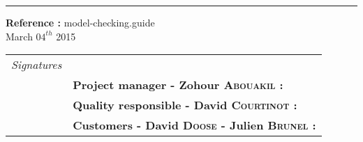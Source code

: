 \documentclass{report}
\begin{document}
\begin{titlepage}


\vspace*{4.5cm}

\noindent
\begin{minipage}{0.35\linewidth}
    \begin{flushright}
        \printauthor
    \end{flushright}
\end{minipage} \hspace{15pt}
%
\begin{minipage}{0.02\linewidth}
    \rule{1pt}{175pt}
\end{minipage} \hspace{-10pt}
%
\begin{minipage}{0.6\linewidth}
\vspace{5pt}
\newenvironment{test}{\begin{center}}{\end{center}}
\hspace{10pt}
\begin{minipage}{\linewidth} 
\textbf{Reference :} model-checking.guide ~\\
March $04^{th}$ 2015
\end{minipage}
\end{minipage}

\vspace{8cm}
\begin{minipage}{0.20\linewidth}
    \begin{flushright}
       
        \begin{tabular}{ll}
     \textit{Signatures} & \\
            & \textbf{Project manager - Zohour \textsc{Abouakil} :} \\
            & \textbf{Quality responsible - David \textsc{Courtinot} :} \\
            & \textbf{Customers - David \textsc{Doose} - Julien \textsc{Brunel} :} \\
        \end{tabular}
    \end{flushright}
\end{minipage}
\end{titlepage}
\restoregeometry
\end{document}
